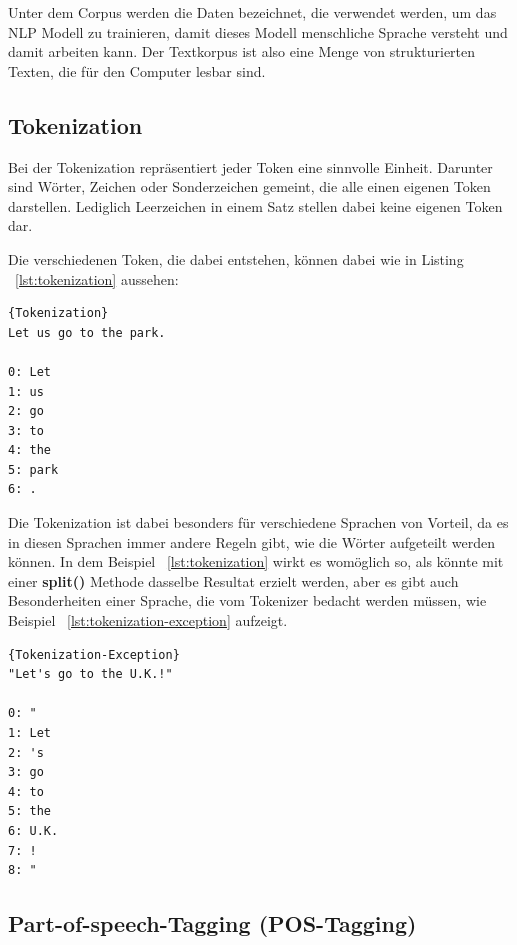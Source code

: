 Unter dem Corpus werden die Daten bezeichnet, die verwendet werden, um das NLP Modell zu trainieren, damit dieses Modell menschliche Sprache versteht und damit arbeiten kann.
Der Textkorpus ist also eine Menge von strukturierten Texten, die für den Computer lesbar sind.\cite{corpus}


\subsection{Tokenization}\label{subsec:tokenization}

Bei der Tokenization repräsentiert jeder Token eine sinnvolle Einheit.
Darunter sind Wörter, Zeichen oder Sonderzeichen gemeint, die alle einen eigenen Token darstellen.
Lediglich Leerzeichen in einem Satz stellen dabei keine eigenen Token dar.\cite{machineLearningTextAnalysis, naturalLanguageProcessing}

Die verschiedenen Token, die dabei entstehen, können dabei wie in Listing ~\ref{lst:tokenization} aussehen:

\begin{lstlisting}[label={lst:tokenization},caption={Beispiel für die Tokenization}]{Tokenization}
Let us go to the park.

0: Let
1: us
2: go
3: to
4: the
5: park
6: .
\end{lstlisting}

Die Tokenization ist dabei besonders für verschiedene Sprachen von Vorteil, da es in diesen Sprachen immer andere Regeln gibt, wie die Wörter aufgeteilt werden können.
In dem Beispiel ~\ref{lst:tokenization} wirkt es womöglich so, als könnte mit einer \textbf{split()} Methode dasselbe Resultat erzielt werden, aber es gibt auch Besonderheiten einer Sprache, die vom Tokenizer bedacht werden müssen, wie Beispiel ~\ref{lst:tokenization-exception} aufzeigt.\cite{machineLearningTextAnalysis, naturalLanguageProcessing}

\begin{lstlisting}[label={lst:tokenization-exception},caption={Ausnahme für bestimmte Tokens}]{Tokenization-Exception}
"Let's go to the U.K.!"

0: "
1: Let
2: 's
3: go
4: to
5: the
6: U.K.
7: !
8: "
\end{lstlisting}

\subsection{Part-of-speech-Tagging (POS-Tagging)}\label{subsec:pos-tagging}

